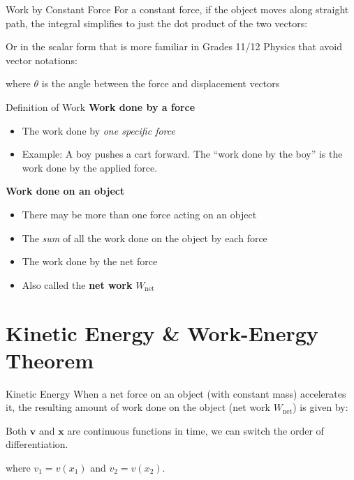 \documentclass[12pt,compress,aspectratio=169]{beamer}
\begin{document}
\begin{frame}{Work by Constant Force}
  For a constant force, if the object moves along straight path, the integral
  simplifies to just the dot product of the two vectors:


  Or in the scalar form that is more familiar in Grades 11/12 Physics that
  avoid vector notations:


  \vspace{-.1in}where $\theta$ is the angle between the force and displacement
  vectors
\end{frame}



\begin{frame}{Definition of Work}
  \textbf{Work done by a force}
  \begin{itemize}
  \item The work done by \emph{one specific force}
  \item Example: A boy pushes a cart forward. The ``work done by the boy'' is
    the work done by the applied force.
  \end{itemize}

  \vspace{.15in}\textbf{Work done on an object}
  \begin{itemize}
  \item There may be more than one force acting on an object
  \item The \emph{sum} of all the work done on the object by each force
  \item The work done by the net force
  \item Also called the \textbf{net work} $W_\text{net}$
  \end{itemize}
\end{frame}



\section{Kinetic Energy \& Work-Energy Theorem}

\begin{frame}{Kinetic Energy}
  When a net force on an object (with constant mass) accelerates it, the
  resulting amount of work done on the object (net work $W_\text{net}$) is
  given by:


  Both $\bm v$ and $\bm x$ are continuous functions in time, we can switch
  the order of differentiation.
  

  where $v_1=v(x_1)$ and $v_2=v(x_2)$.
\end{frame}
\end{document}
